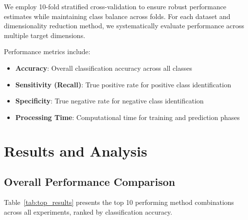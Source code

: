 \documentclass[review]{elsarticle}
\begin{document}
We employ 10-fold stratified cross-validation to ensure robust performance estimates while maintaining class balance across folds. For each dataset and dimensionality reduction method, we systematically evaluate performance across multiple target dimensions.

Performance metrics include:
\begin{itemize}
\item \textbf{Accuracy}: Overall classification accuracy across all classes
\item \textbf{Sensitivity (Recall)}: True positive rate for positive class identification
\item \textbf{Specificity}: True negative rate for negative class identification
\item \textbf{Processing Time}: Computational time for training and prediction phases
\end{itemize}

\section{Results and Analysis}
\label{sec:results}

\subsection{Overall Performance Comparison}

Table~\ref{tab:top_results} presents the top 10 performing method combinations across all experiments, ranked by classification accuracy.
\end{document}
